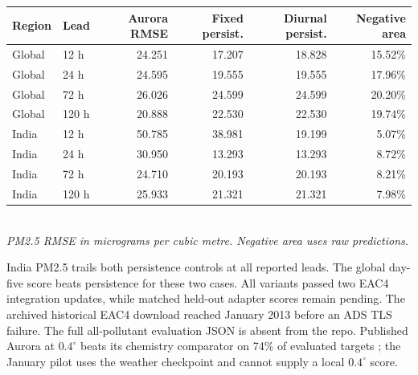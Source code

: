 \documentclass[10pt,a4paper]{article}
\begin{document}
\begin{center}
\begin{tabular}{@{}llrrrr@{}}
\toprule Region & Lead & Aurora RMSE & Fixed persist. & Diurnal persist. & Negative area\\\midrule
Global & 12 h & 24.251 & 17.207 & 18.828 & 15.52\%\\
Global & 24 h & 24.595 & 19.555 & 19.555 & 17.96\%\\
Global & 72 h & 26.026 & 24.599 & 24.599 & 20.20\%\\
Global & 120 h & 20.888 & 22.530 & 22.530 & 19.74\%\\
India & 12 h & 50.785 & 38.981 & 19.199 & 5.07\%\\
India & 24 h & 30.950 & 13.293 & 13.293 & 8.72\%\\
India & 72 h & 24.710 & 20.193 & 20.193 & 8.21\%\\
India & 120 h & 25.933 & 21.321 & 21.321 & 7.98\%\\\bottomrule
\end{tabular}\\
\textit{PM2.5 RMSE in micrograms per cubic metre. Negative area uses raw predictions.}
\end{center}
India PM2.5 trails both persistence controls at all reported leads. The global day-five score beats persistence for these two cases. All variants passed two EAC4 integration updates, while matched held-out adapter scores remain pending. The archived historical EAC4 download reached January 2013 before an ADS TLS failure. The full all-pollutant evaluation JSON is absent from the repo. Published Aurora at \(0.4^\circ\) beats its chemistry comparator on 74\% of evaluated targets \cite{aurora}; the January pilot uses the weather checkpoint and cannot supply a local \(0.4^\circ\) score.

\newpage
\end{document}
